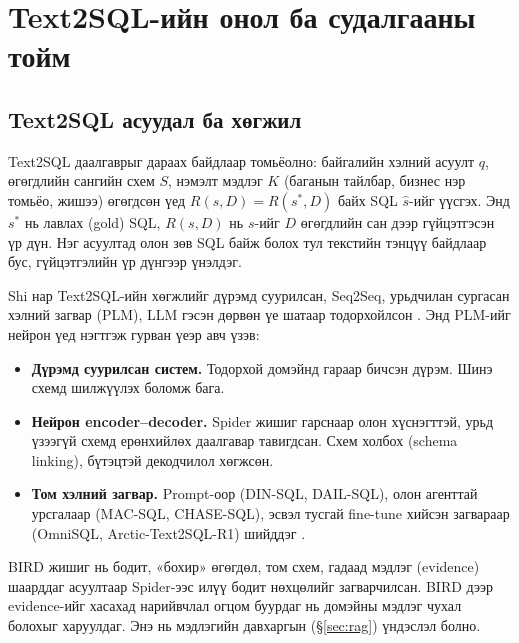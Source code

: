 
\chapter{Text2SQL-ийн онол ба судалгааны тойм}
\label{Chapter1}
\pagecolor{white}

\section{Text2SQL асуудал ба хөгжил}
\label{sec:t2s-problem}

Text2SQL даалгаврыг дараах байдлаар томьёолно: байгалийн хэлний асуулт $q$, өгөгдлийн сангийн схем $S$, нэмэлт мэдлэг
$K$ (баганын тайлбар, бизнес нэр томьёо, жишээ) өгөгдсөн үед $R(\hat{s}, D) = R(s^{\ast}, D)$ байх SQL $\hat{s}$-ийг
үүсгэх. Энд $s^{\ast}$ нь лавлах (gold) SQL, $R(s, D)$ нь $s$-ийг $D$ өгөгдлийн сан дээр гүйцэтгэсэн үр дүн. Нэг
асуултад олон зөв SQL байж болох тул текстийн тэнцүү байдлаар бус, гүйцэтгэлийн үр дүнгээр үнэлдэг.

Shi нар Text2SQL-ийн хөгжлийг дүрэмд суурилсан, Seq2Seq, урьдчилан сургасан хэлний загвар (PLM), LLM гэсэн дөрвөн
үе шатаар тодорхойлсон \cite{shi_2025_survey_llm_text2sql}. Энд PLM-ийг нейрон үед нэгтгэж гурван үеэр авч үзэв:
\begin{itemize}
  \item \textbf{Дүрэмд суурилсан систем.} Тодорхой домэйнд гараар бичсэн дүрэм. Шинэ схемд шилжүүлэх боломж бага.
  \item \textbf{Нейрон encoder--decoder.} Spider жишиг \cite{yu_2018_spider} гарснаар олон хүснэгттэй, урьд үзээгүй
        схемд ерөнхийлөх даалгавар тавигдсан. Схем холбох (schema linking), бүтэцтэй декодчилол хөгжсөн.
  \item \textbf{Том хэлний загвар.} Prompt-оор (DIN-SQL, DAIL-SQL), олон агенттай урсгалаар (MAC-SQL, CHASE-SQL), эсвэл
        тусгай fine-tune хийсэн загвараар (OmniSQL, Arctic-Text2SQL-R1) шийддэг
        \cite{pourreza_2023_din_sql, gao_2024_dail_sql, wang_2025_mac_sql, pourreza_2024_chase_sql, li_2025_omnisql,
        yao_2025_arctic_text2sql_r1}.
\end{itemize}

BIRD жишиг \cite{li_2023_bird} нь бодит, «бохир» өгөгдөл, том схем, гадаад мэдлэг (evidence) шаарддаг асуултаар
Spider-ээс илүү бодит нөхцөлийг загварчилсан. BIRD дээр evidence-ийг хасахад нарийвчлал огцом буурдаг нь домэйны мэдлэг
чухал болохыг харуулдаг. Энэ нь мэдлэгийн давхаргын (§\ref{sec:rag}) үндэслэл болно.

